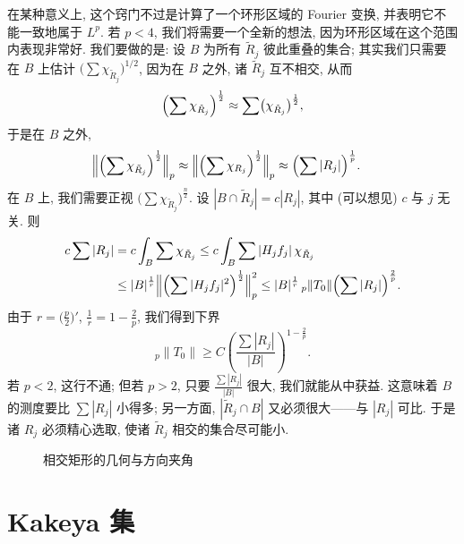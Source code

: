 在某种意义上, 这个窍门不过是计算了一个环形区域的 Fourier 变换, 并表明它不能一致地属于 $L^p$. 若 $p<4$, 我们将需要一个全新的想法, 因为环形区域在这个范围内表现非常好. 我们要做的是: 设 $B$ 为所有 $\tilde{R}_j$ 彼此重叠的集合; 其实我们只需要在 $B$ 上估计 $\bigl(\sum\chi_{\tilde{R}_j}\bigr)^{1/2}$, 因为在 $B$ 之外, 诸 $\tilde{R}_j$ 互不相交, 从而
\[
\Bigl(\sum\chi_{\tilde{R}_{j}}\Bigr)^{\frac{1}{2}}\approx\sum\bigl(\chi_{\tilde{R}_{j}}\bigr)^{\frac{1}{2}},
\]
于是在 $B$ 之外,
\begin{align*}
\Bigl\|\Bigl(\sum\chi_{\tilde{R}_{j}}\Bigr)^{\frac{1}{2}}\Bigr\|_{p}
&\approx\Bigl\|\Bigl(\sum\chi_{R_{j}}\Bigr)^{\frac{1}{2}}\Bigr\|_{p}
\approx\Bigl(\sum|R_{j}|\Bigr)^{\frac{1}{p}}.
\end{align*}
在 $B$ 上, 我们需要正视 $\bigl(\sum\chi_{\tilde{R}_j}\bigr)^{\frac{n}{2}}$. 设 $|B\cap\tilde{R}_j|=c|R_j|$, 其中 (可以想见) $c$ 与 $j$ 无关. 则
\begin{align*}
c\sum|R_{j}|&=c\int_{B}\sum\chi_{\tilde{R}_{j}}
\leq c\int_{B}\sum|H_{j}f_{j}|\,\chi_{\tilde{R}_{j}} \\
&\leq|B|^{\frac{1}{r}}\Bigl\|\Bigl(\sum|H_{j}f_{j}|^{2}\Bigr)^{\frac{1}{2}}\Bigr\|_{p}^{2}
\leq|B|^{\frac{1}{r}}\,{}_p\|T_{0}\|\Bigl(\sum|R_{j}|\Bigr)^{\frac{2}{p}}.
\end{align*}
由于 $r=\bigl(\frac{p}{2}\bigr)'$, $\frac{1}{r}=1-\frac{2}{p}$, 我们得到下界
\[
{}_{p}\|T_{0}\|\geq C\left(\frac{\sum|R_{j}|}{|B|}\right)^{1-\frac{2}{p}}.
\]
若 $p<2$, 这行不通; 但若 $p>2$, 只要 $\frac{\sum|R_j|}{|B|}$ 很大, 我们就能从中获益. 这意味着 $B$ 的测度要比 $\sum|R_j|$ 小得多; 另一方面, $|\tilde{R}_j\cap B|$ 又必须很大——与 $|R_j|$ 可比. 于是诸 $R_j$ 必须精心选取, 使诸 $\tilde{R}_j$ 相交的集合尽可能小.

\begin{figure}[htbp]
\centering
{}
\caption{相交矩形的几何与方向夹角}
\label{fig:8}
\end{figure}

\section{Kakeya 集}
\label{sec:7.2}

